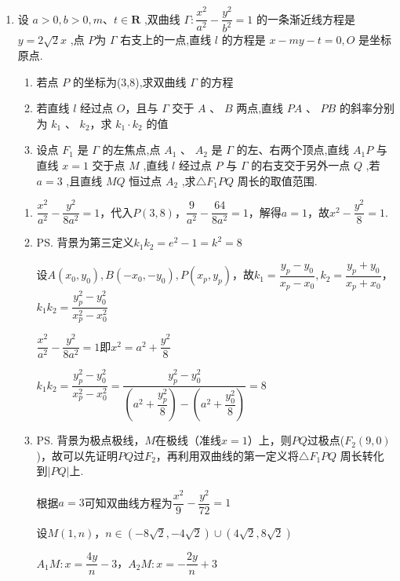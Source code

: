 \begin{enumerate}
    \item 设 $a > 0,b > 0,m\text{、}t \in  \mathbf{R}$ ,双曲线 $\Gamma  : \dfrac{{x}^{2}}{{a}^{2}} - \dfrac{{y}^{2}}{{b}^{2}} = 1$ 的一条渐近线方程是 $y = 2\sqrt{2}x$ ,点 $P$为 $\Gamma$ 右支上的一点,直线 $l$ 的方程是 $x - {my} - t = 0,O$ 是坐标原点.
    \begin{enumerate}
        \item 若点 $P$ 的坐标为(3,8),求双曲线 $\Gamma$ 的方程
        \item 若直线 $l$ 经过点 $O$，且与 $\Gamma$ 交于 $A$ 、 $B$ 两点,直线 ${PA}$ 、 ${PB}$ 的斜率分别为 ${k}_{1}$ 、 ${k}_{2}$，求 ${k}_{1} \cdot  {k}_{2}$ 的值
        \item 设点 ${F}_{1}$ 是 $\Gamma$ 的左焦点,点 ${A}_{1}$ 、 ${A}_{2}$ 是 $\Gamma$ 的左、右两个顶点,直线 ${A}_{1}P$ 与直线 $x = 1$ 交于点 $M$ ,直线 $l$ 经过点 $P$ 与 $\Gamma$ 的右支交于另外一点 $Q$ ,若 $a = 3$ ,且直线 ${MQ}$ 恒过点 ${A}_{2}$ ,求$\bigtriangleup {F}_{1}{PQ}$ 周长的取值范围.
    \end{enumerate}
    \begin{jieda}
        \begin{enumerate}
            \item $\dfrac{x^2}{a^2} - \dfrac{y^2}{8a^2} = 1$，代入$P(3, 8)$，$\dfrac{9}{a^2} - \dfrac{64}{8a^2} = 1$，解得$a = 1$，故$x^2 - \dfrac{y^2}{8} = 1$.
            \item \ps 背景为第三定义$k_1k_2 = e^2 - 1 = k^2 = 8$

            设$A(x_0, y_0), B(-x_0, -y_0), P(x_p, y_p)$，故$k_1 = \dfrac{y_p - y_0}{x_p - x_0}, k_2 = \dfrac{y_p + y_0}{x_p + x_0}$，$k_1k_2 = \dfrac{y_p^2-y_0^2}{x_p^2-x_0^2}$

            $\dfrac{x^2}{a^2} - \dfrac{y^2}{8a^2} = 1$即$x^2 = a^2 + \dfrac{y^2}{8}$

            $k_1k_2 = \dfrac{y_p^2-y_0^2}{x_p^2-x_0^2} = \dfrac{y_p^2-y_0^2}{\left(a^2+\dfrac{y_p^2}{8}\right) - \left(a^2+\dfrac{y_0^2}{8}\right)} = 8$

            \item \ps 背景为极点极线，$M$在极线（准线$x = 1$）上，则$PQ$过极点($F_2(9, 0)$)，故可以先证明$PQ$过$F_2$，再利用双曲线的第一定义将$\bigtriangleup {F}_{1}{PQ}$ 周长转化到$|PQ|$上.

            根据$a = 3$可知双曲线方程为$\dfrac{x^2}{9} - \dfrac{y^2}{72} = 1$

            设$M(1, n)$，$n \in (-8\sqrt{2}, -4\sqrt{2}) \cup (4\sqrt{2}, 8\sqrt{2})$

            $A_1M: x = \dfrac{4y}{n} - 3$，$A_2M: x = -\dfrac{2y}{n}+3$


\end{enumerate}
\end{jieda}
\end{enumerate}
